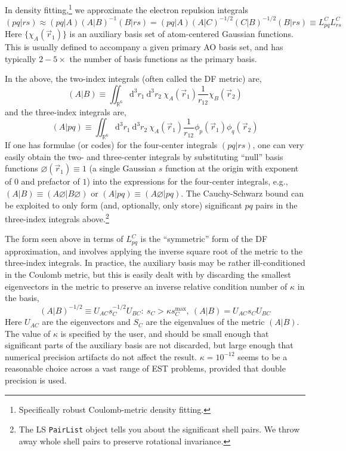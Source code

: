 \documentclass[fleqn,oneside,12pt]{article}
\begin{document}
In density fitting,\footnote{Specifically robust Coulomb-metric density
fitting.} we approximate the electron repulsion integrals
\[
(pq|rs)
\approx
(pq|A)
(A|B)^{-1}
(B|rs)
=
(pq|A)
(A|C)^{-1/2}
(C|B)^{-1/2}
(B|rs)
\equiv
L_{pq}^{C}
L_{rs}^{C}
\]
Here $\{ \chi_{A} (\vec r_1) \}$ is an auxiliary basis set of atom-centered
Gaussian functions. This is usually defined to accompany a given primary AO
basis set, and has typically $2-5\times$ the number of basis functions as the
primary basis.

In the above, the two-index integrals (often called the DF metric) are,
\[
(A|B)
\equiv
\iint_{\mathbb{R}^6}
\mathrm{d}^3 r_1 \
\mathrm{d}^3 r_2 \
\chi_{A} (\vec r_1)
\frac{1}{r_{12}}
\chi_{B} (\vec r_2)
\]
and the three-index integrals are,
\[
(A|pq)
\equiv
\iint_{\mathbb{R}^6}
\mathrm{d}^3 r_1 \
\mathrm{d}^3 r_2 \
\chi_{A} (\vec r_1)
\frac{1}{r_{12}}
\phi_{p} (\vec r_1)
\phi_{q} (\vec r_2)
\]
If one has formulae (or codes) for the four-center integrals $(pq|rs)$, one can
very easily obtain the two- and three-center integrals by substituting ``null''
basis functions $\varnothing (\vec r_1) \equiv 1$ (a single Gaussian $s$
function at the origin with exponent of $0$ and prefactor of $1$) into the
expressions for the four-center integrals, e.g., $(A|B) \equiv (A \varnothing |
B \varnothing)$ or $(A|pq) \equiv (A \varnothing | pq)$. The Cauchy-Schwarz
bound can be exploited to only form (and, optionally, only store) significant
$pq$ pairs in the three-index integrals above.\footnote{The LS \texttt{PairList}
object tells you about the significant shell pairs. We throw away whole shell
pairs to preserve rotational invariance.}

The form seen above in terms of $L_{pq}^{C}$ is the ``symmetric'' form of the DF
approximation, and involves applying the inverse square root of the metric to
the three-index integrals. In practice, the auxiliary basis may be rather
ill-conditioned in the Coulomb metric, but this is easily dealt with by
discarding the smallest eigenvectors in the metric to preserve an inverse
relative condition number of $\kappa$ in the basis,
\[
(A|B)^{-1/2}
\equiv
U_{AC}
s_{C}^{-1/2}
U_{BC}
: \
s_{C} > \kappa s_{C}^{\mathrm{max}}
,
\
(A|B)
=
U_{AC}
s_{C}
U_{BC}
\]
Here $U_{AC}$ are the eigenvectors and $S_{C}$ are the eigenvalues of the metric
$(A|B)$. The value of $\kappa$ is specified by the user, and should be small
enough that significant parts of the auxiliary basis are not discarded, but
large enough that numerical precision artifacts do not affect the result.
$\kappa = 10^{-12}$ seems to be a reasonable choice across a vast range of
EST problems, provided that double precision is used.
\end{document}
